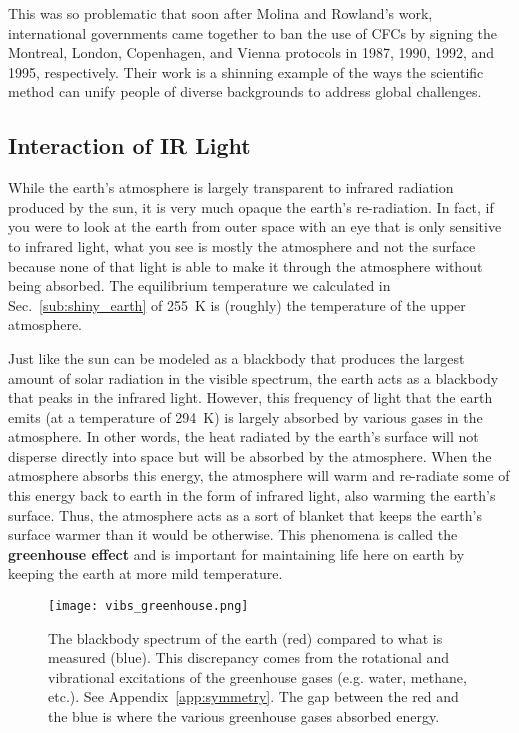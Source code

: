     This was so problematic that soon after Molina and Rowland's work, international governments came together to ban the use of CFCs by signing the Montreal, London, Copenhagen, and Vienna protocols in 1987, 1990, 1992, and 1995, respectively.\cite{spiro2012chemistry} Their work is a shinning example of the ways the scientific method can unify people of diverse backgrounds to address global challenges.


    \subsection{Interaction of IR Light} %
    \label{sub:ir_light}

    While the earth's atmosphere is largely transparent to infrared radiation produced by the sun, it is very much opaque the earth's re-radiation. In fact, if you were to look at the earth from outer space with an eye that is only sensitive to infrared light, what you see is mostly the atmosphere and not the surface because none of that light is able to make it through the atmosphere without being absorbed. The equilibrium temperature we calculated in Sec.~\ref{sub:shiny_earth} of \SI{255}{\kelvin} is (roughly) the temperature of the upper atmosphere.\cite{schroeder1999introduction} 

    Just like the sun can be modeled as a blackbody that produces the largest amount of solar radiation in the visible spectrum, the earth acts as a blackbody that peaks in the infrared light. However, this frequency of light that the earth emits (at a temperature of \SI{294}{\kelvin}) is largely absorbed by various gases in the atmosphere. In other words, the heat radiated by the earth's surface will not disperse directly into space but will be absorbed by the atmosphere. When the atmosphere absorbs this energy, the atmosphere will warm and re-radiate some of this energy back to earth in the form of infrared light, also warming the earth's surface. Thus, the atmosphere acts as a sort of blanket that keeps the earth's surface warmer than it would be otherwise. This phenomena is called the \textbf{greenhouse effect} and is important for maintaining life here on earth by keeping the earth at more mild temperature.

    \begin{figure}[ht]
        \centering
        \texttt{[image: vibs\_greenhouse.png]}
        \caption{The blackbody spectrum of the earth (red) compared to what is measured (blue). This discrepancy comes from the rotational and vibrational excitations of the greenhouse gases (e.g. water, methane, etc.). See Appendix~\ref{app:symmetry}. The gap between the red and the blue is where the various greenhouse gases absorbed energy.}
        \label{fig:earth_bb}
    \end{figure}

